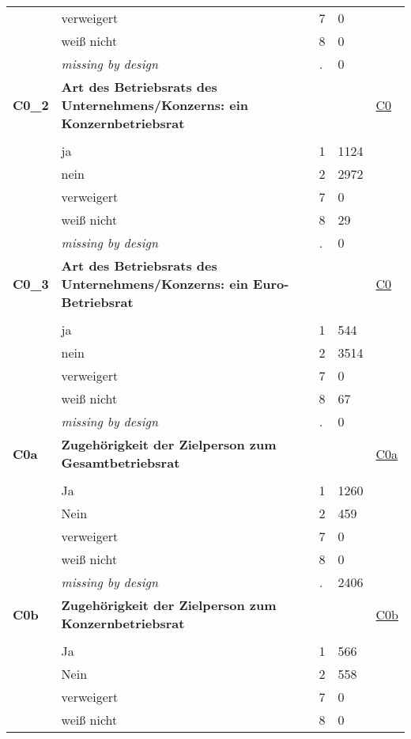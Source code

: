 \begin{longtable}{| L{2.65cm} | L{8cm} | C{1.5cm} | R{1.25cm} | C{2.25cm}  |}
   & verweigert & 7 & 0 &  \\ 
   & weiß nicht & 8 & 0 &  \\ 
   & \textit{missing by design} & \textit{.} & 0 &  \\ 
   \midrule
\textbf{C0\_2}\label{var:C0:2} & \textbf{Art des Betriebsrats des Unternehmens/Konzerns: ein Konzernbetriebsrat} &  &  & \hyperref[C0]{C0} \\ 
   &  &  &  &  \\ 
   & ja & 1 & 1124 &  \\ 
   & nein & 2 & 2972 &  \\ 
   & verweigert & 7 & 0 &  \\ 
   & weiß nicht & 8 & 29 &  \\ 
   & \textit{missing by design} & \textit{.} & 0 &  \\ 
   \midrule
\textbf{C0\_3}\label{var:C0:3} & \textbf{Art des Betriebsrats des Unternehmens/Konzerns: ein Euro-Betriebsrat} &  &  & \hyperref[C0]{C0} \\ 
   &  &  &  &  \\ 
   & ja & 1 & 544 &  \\ 
   & nein & 2 & 3514 &  \\ 
   & verweigert & 7 & 0 &  \\ 
   & weiß nicht & 8 & 67 &  \\ 
   & \textit{missing by design} & \textit{.} & 0 &  \\ 
   \midrule
\textbf{C0a}\label{var:C0a} & \textbf{Zugehörigkeit der Zielperson zum Gesamtbetriebsrat} &  &  & \hyperref[C0a]{C0a} \\ 
   &  &  &  &  \\ 
   & Ja & 1 & 1260 &  \\ 
   & Nein & 2 & 459 &  \\ 
   & verweigert & 7 & 0 &  \\ 
   & weiß nicht & 8 & 0 &  \\ 
   & \textit{missing by design} & \textit{.} & 2406 &  \\ 
   \midrule
\textbf{C0b}\label{var:C0b} & \textbf{Zugehörigkeit der Zielperson zum Konzernbetriebsrat} &  &  & \hyperref[C0b]{C0b} \\ 
   &  &  &  &  \\ 
   & Ja & 1 & 566 &  \\ 
   & Nein & 2 & 558 &  \\ 
   & verweigert & 7 & 0 &  \\ 
   & weiß nicht & 8 & 0 &  \\ 

\end{longtable}
